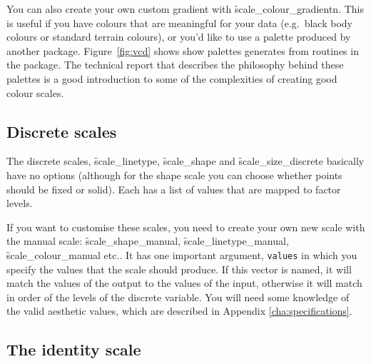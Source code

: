 
You can also create your own custom gradient with \f{scale_colour_gradientn}.  This is useful if you have colours that are meaningful for your data (e.g.\ black body colours or standard terrain colours), or you'd like to use a palette produced by another package.  Figure~\ref{fig:vcd} shows show palettes generates from routines in the  package.  The technical report \citet{zeileis:2007} that describes the philosophy behind these palettes is a good introduction to some of the complexities of creating good colour scales.

% 

\subsection{Discrete scales}
\label{sub:scale-discrete}

The discrete scales, \f{scale_linetype}, \f{scale_shape} and \f{scale_size_discrete} basically have no options (although for the shape scale you can choose whether points should be fixed or solid). Each has a list of values that are mapped to factor levels.

If you want to customise these scales, you need to create your own new scale with the manual scale: \f{scale_shape_manual}, \f{scale_linetype_manual}, \f{scale_colour_manual} etc..  It has one important argument, \verb|values| in which you specify the values that the scale should produce.  If this vector is named, it will match the values of the output to the values of the input, otherwise it will match in order of the levels of the discrete variable.   You will need some knowledge of the valid aesthetic values, which are described in Appendix \ref{cha:specifications}.


\subsection{The identity scale}
\label{sub:scale-identity}

